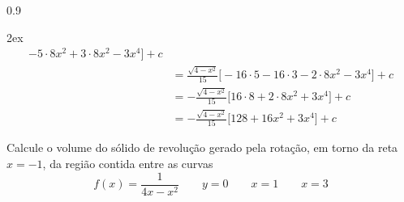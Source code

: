 \documentclass[a4paper,12pt,fleqn]{article}
\newenvironment{resposta}%
  {\begingroup\color{blue}\small\begin{spacing}{0.9}}%
  {\end{spacing}\endgroup}
\begin{document}
\begin{resposta}
\begin{enumerate}[label=\alph*)]
\begin{spreadlines}{2ex}
\begin{align*}
            - 5\cdot 8x^2 + 3\cdot 8x^2
            - 3x^4
            \Big] + c \\
        & = \frac{\sqrt{4-x^2}}{15}
            \Big[
            - 16\cdot 5 -16 \cdot 3
            - 2\cdot 8x^2
            - 3x^4
            \Big] + c \\
        & = -\frac{\sqrt{4-x^2}}{15}
            \Big[
              16\cdot 8
            + 2\cdot 8x^2
            + 3x^4
            \Big] + c \\
        & = -\frac{\sqrt{4-x^2}}{15}
            \Big[ 128 + 16x^2 + 3x^4 \Big] + c
      \end{align*}
      \end{spreadlines}

%
  \end{enumerate}
\end{resposta}

\vspace{\baselineskip}
Calcule o volume do sólido de revolução gerado pela rotação,
em torno da reta \(x=-1\), da região contida entre as curvas
\[
  f(x) = \frac{1}{4x-x^2} \qquad
  y = 0 \qquad
  x = 1 \qquad
  x = 3
\]
\end{document}
